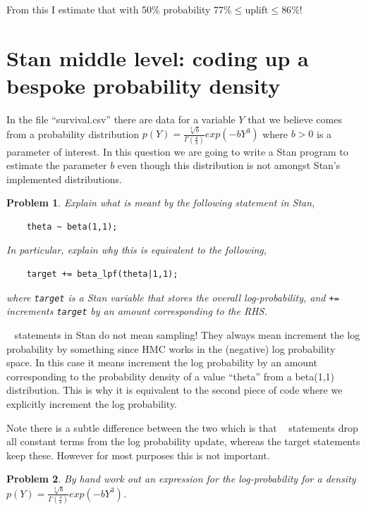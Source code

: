 \documentclass{article}
\newtheorem{problem}{Problem}[section]
\begin{document}
From this I estimate that with 50\% probability $77\% \leq \text{uplift} \leq 86\%$!

\section{Stan middle level: coding up a bespoke probability density}
In the file ``survival.csv'' there are data for a variable $Y$ that we believe comes from a probability distribution $p(Y) =\frac{\sqrt[3]{b}}{\Gamma\left(\frac{4}{3}\right)} exp(-b Y^3)$ where $b>0$ is a parameter of interest. In this question we are going to write a Stan program to estimate the parameter $b$ even though this distribution is not amongst Stan's implemented distributions.

\begin{problem}
	Explain what is meant by the following statement in Stan,
	
	\begin{verbatim}
	theta ~ beta(1,1);
	\end{verbatim}
	
	In particular, explain why this is equivalent to the following,
	
	\begin{verbatim}
	target += beta_lpf(theta|1,1);
	\end{verbatim}
	
	where \texttt{target} is a Stan variable that stores the overall log-probability, and \texttt{+=} increments \texttt{target} by an amount corresponding to the RHS.
	
\end{problem}

\texttt{~} statements in Stan do not mean sampling! They always mean increment the log probability by something since HMC works in the (negative) log probability space. In this case it means increment the log probability by an amount corresponding to the probability density of a value ``theta'' from a beta(1,1) distribution. This is why it is equivalent to the second piece of code where we explicitly increment the log probability. 

Note there is a subtle difference between the two which is that \texttt{~} statements drop all constant terms from the log probability update, whereas the target statements keep these. However for most purposes this is not important.


\begin{problem}
	By hand work out an expression for the log-probability for a density $p(Y) =\frac{\sqrt[3]{b}}{\Gamma\left(\frac{4}{3}\right)} exp(-b Y^3)$.
\end{problem}
\end{document}
